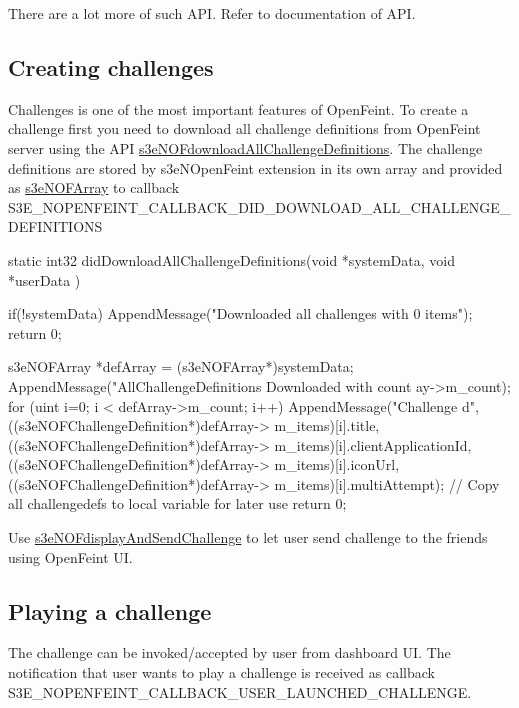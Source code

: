 There are a lot more of such API. Refer to documentation of API.\hypertarget{main_sec_4_4}{}\subsection{Creating challenges}\label{main_sec_4_4}
Challenges is one of the most important features of OpenFeint. To create a challenge first you need to download all challenge definitions from OpenFeint server using the API \hyperlink{group___n_open_feint_api_group_ga3b6050107c6b8a85bbc40a99efdc0bbb}{s3eNOFdownloadAllChallengeDefinitions}. The challenge definitions are stored by s3eNOpenFeint extension in its own array and provided as \hyperlink{structs3e_n_o_f_array}{s3eNOFArray} to callback S3E\_\-NOPENFEINT\_\-CALLBACK\_\-DID\_\-DOWNLOAD\_\-ALL\_\-CHALLENGE\_\-DEFINITIONS


\begin{DoxyCode}
 static int32 didDownloadAllChallengeDefinitions(void *systemData, void *userData
      )
 {
        if(!systemData)
        {
                AppendMessage("Downloaded all challenges with 0 items");
                return 0;
        }
                
        s3eNOFArray *defArray = (s3eNOFArray*)systemData;
        AppendMessage("AllChallengeDefinitions Downloaded with count %
      ay->m_count);
        for (uint i=0; i < defArray->m_count; i++) {
                AppendMessage("Challenge %
      d",
                                          ((s3eNOFChallengeDefinition*)defArray->
      m_items)[i].title,
                                          ((s3eNOFChallengeDefinition*)defArray->
      m_items)[i].clientApplicationId,
                                          ((s3eNOFChallengeDefinition*)defArray->
      m_items)[i].iconUrl,
                                          ((s3eNOFChallengeDefinition*)defArray->
      m_items)[i].multiAttempt);
        }
        // Copy all challengedefs to local variable for later use
        return 0;
 }
\end{DoxyCode}


Use \hyperlink{group___n_open_feint_api_group_ga396467328a4a70b44493263ceffec609}{s3eNOFdisplayAndSendChallenge} to let user send challenge to the friends using OpenFeint UI.\hypertarget{main_sec_4_5}{}\subsection{Playing a challenge}\label{main_sec_4_5}
The challenge can be invoked/accepted by user from dashboard UI. The notification that user wants to play a challenge is received as callback S3E\_\-NOPENFEINT\_\-CALLBACK\_\-USER\_\-LAUNCHED\_\-CHALLENGE.


